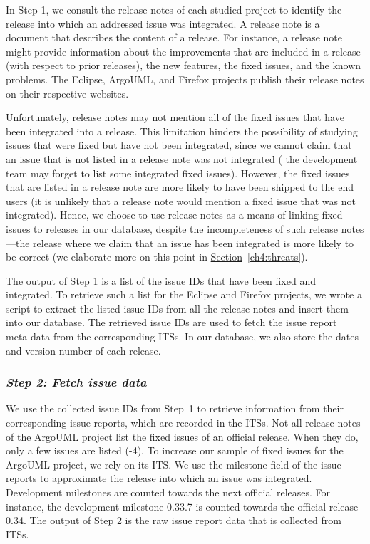 In Step 1, we consult the release notes of each studied project to identify the
release into which an addressed issue was integrated. A release note is a
document that describes the content of a release. For instance, a release note
might provide information about the improvements that are included in a release (with
respect to prior releases), the new features, the fixed issues, and the known
problems. The Eclipse, ArgoUML, and Firefox projects publish their release notes on their
respective websites.

Unfortunately, release notes may not mention all of the fixed issues that have
been integrated into a release. This limitation hinders the possibility of
studying issues that were fixed but have not been integrated, since we cannot
claim that an issue that is not listed in a release note was not integrated (\eg
the development team may forget to list some integrated fixed issues). However,
the fixed issues that are listed in a release note are more likely to have been
shipped to the end users (\ie it is unlikely that a release note would mention a fixed
issue that was not integrated). Hence, we choose to use release notes as a means
of linking fixed issues to releases in our database, despite the incompleteness
of such release notes---the release where we claim that an issue has been
integrated is more likely to be correct (we elaborate more on this point in
\hyperref[ch4:threats]{Section}~\ref{ch4:threats}).

The output of Step 1 is a list of the issue IDs that have been fixed and
integrated. To retrieve such a list for the Eclipse and Firefox projects, we
wrote a script to extract the listed issue IDs from all the release notes and
insert them into our database. The retrieved issue IDs are used to fetch the
issue report meta-data from the corresponding ITSs. In our database, we also
store the dates and version number of each release. 

\subsubsection*{\textbf{\textit{Step 2: Fetch issue data}}}

We use the collected issue IDs from Step~1 to retrieve information from their corresponding
issue reports, which
are recorded in the ITSs. Not all release notes of
the ArgoUML project
list the fixed issues of an official release. When they do,
only a few issues are listed (-4).
To increase our sample of fixed issues for the ArgoUML project, we rely on its
ITS. We use the milestone field of
the issue reports to approximate the release into which an issue was integrated.
Development milestones are counted towards the next official releases. For
instance, the development milestone
0.33.7
is counted towards the official release 0.34. The output of Step 2 is the raw
issue report data that is collected from ITSs.

